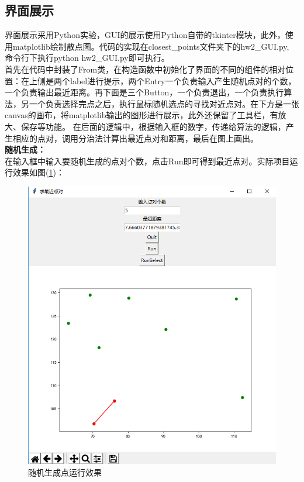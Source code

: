 \documentclass[UTF8]{ctexart}
\begin{document}
\subsection{界面展示}

界面展示采用Python实验，GUI的展示使用Python自带的tkinter模块，此外，使用matplotlib绘制散点图。代码的实现在closest\_points文件夹下的hw2\_GUI.py, 命令行下执行python hw2\_GUI.py即可执行。\\

首先在代码中封装了From类，在构造函数中初始化了界面的不同的组件的相对位置：在上侧是两个label进行提示，两个Entry一个负责输入产生随机点对的个数，一个负责输出最近距离。再下面是三个Button，一个负责退出，一个负责执行算法，另一个负责选择完点之后，执行鼠标随机选点的寻找对近点对。在下方是一张canvas的画布，将matplotlib输出的图形进行展示，此外还保留了工具栏，有放大、保存等功能。
在后面的逻辑中，根据输入框的数字，传递给算法的逻辑，产生相应的点对，调用分治法计算出最近点对和距离，最后在图上画出。\\

\textbf{随机生成：}\\
在输入框中输入要随机生成的点对个数，点击Run即可得到最近点对。实际项目运行效果如图(\ref{img1-4})：

\begin{figure}[H]
    \centering
    \includegraphics[width=1\textwidth]{img/1-4.png}
    \caption{随机生成点运行效果}
    \label{img1-4}
\end{figure}
\end{document}

